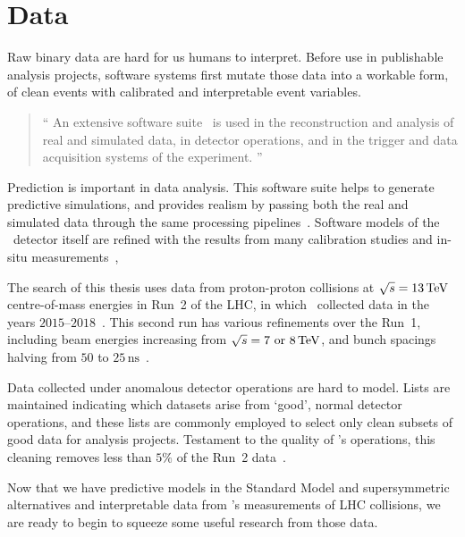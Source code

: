 \section{Data}
\label{sec:atlas_data}
Raw binary data are hard for us humans to interpret.
Before use in publishable analysis projects, software systems first mutate
those data into a workable form, of clean events with calibrated and
interpretable event variables.
\begin{quote}
``%
An extensive software suite~\cite{ATL-SOFT-PUB-2021-001} is used in the
reconstruction and analysis of real and simulated data, in detector operations,
and in the trigger and data acquisition systems of the experiment.%
''~\cite{atlas2022searches}
\end{quote}
Prediction is important in data analysis.
This software suite helps to generate predictive simulations, and provides
realism by passing both the real and simulated data through the same processing
pipelines~\cite{SOFT-2010-01, geant2003}.
Software models of the \atlas\ detector itself are refined with the results from
many calibration studies and in-situ measurements~\cite{atlas2008experiment},

The search of this thesis uses data from proton-proton collisions at
$\sqrt{s} = 13\,\eV[T]$ centre-of-mass energies in Run~2 of the
LHC, in which \atlas\ collected data in the years
$2015\textrm{--}2018$~\cite{atlas2022searches}.
This second run has various refinements over the Run~1, including beam energies
increasing from $\sqrt{s} = 7\textrm{ or }8\,\eV[T]$, and bunch spacings
halving from $50$ to $25\,\textrm{ns}$~\cite{lhc2006run2}.

Data collected under anomalous detector operations are hard to model.
Lists are maintained indicating which datasets arise from `good', normal
detector operations, and these lists are commonly employed to select only clean
subsets of good data for analysis projects.
Testament to the quality of \atlas's operations, this cleaning removes less
than $5\%$ of the Run~2 data~\cite{
DAPR-2018-01,
Golling:2011zy
}.

Now that we have predictive models in the Standard Model and supersymmetric
alternatives
and interpretable data from \atlas's measurements of LHC collisions,
we are ready to begin to squeeze some useful research from those data.

